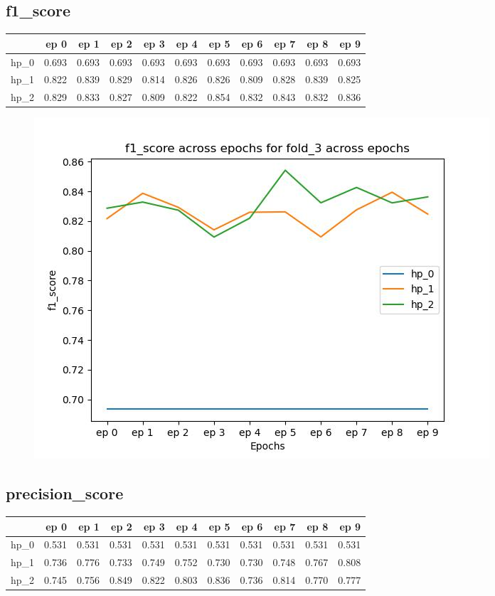 \documentclass{article}
\begin{document}
\subsection{f1\_score}
\begin{tabular}{lrrrrrrrrrr}
\toprule
{} &   ep 0 &   ep 1 &   ep 2 &   ep 3 &   ep 4 &   ep 5 &   ep 6 &   ep 7 &   ep 8 &   ep 9 \\
\midrule
hp\_0 &  0.693 &  0.693 &  0.693 &  0.693 &  0.693 &  0.693 &  0.693 &  0.693 &  0.693 &  0.693 \\
hp\_1 &  0.822 &  0.839 &  0.829 &  0.814 &  0.826 &  0.826 &  0.809 &  0.828 &  0.839 &  0.825 \\
hp\_2 &  0.829 &  0.833 &  0.827 &  0.809 &  0.822 &  0.854 &  0.832 &  0.843 &  0.832 &  0.836 \\
\bottomrule
\end{tabular}

\begin{figure}[H]
\includegraphics[scale = 0.75]{fold_3/f1_score}
\end{figure}
\subsection{precision\_score}
\begin{tabular}{lrrrrrrrrrr}
\toprule
{} &   ep 0 &   ep 1 &   ep 2 &   ep 3 &   ep 4 &   ep 5 &   ep 6 &   ep 7 &   ep 8 &   ep 9 \\
\midrule
hp\_0 &  0.531 &  0.531 &  0.531 &  0.531 &  0.531 &  0.531 &  0.531 &  0.531 &  0.531 &  0.531 \\
hp\_1 &  0.736 &  0.776 &  0.733 &  0.749 &  0.752 &  0.730 &  0.730 &  0.748 &  0.767 &  0.808 \\
hp\_2 &  0.745 &  0.756 &  0.849 &  0.822 &  0.803 &  0.836 &  0.736 &  0.814 &  0.770 &  0.777 \\
\bottomrule
\end{tabular}
\end{document}
